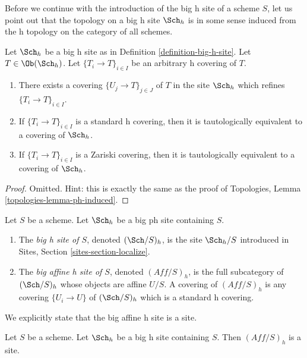 \medskip\noindent
Before we continue with the introduction of the big h site of
a scheme $S$, let us point out that the topology on a big h site
$\Sch_h$ is in some sense induced from the h topology
on the category of all schemes.

\begin{lemma}
\label{lemma-h-induced}
Let $\Sch_h$ be a big h site as in
Definition \ref{definition-big-h-site}.
Let $T \in \Ob(\Sch_h)$.
Let $\{T_i \to T\}_{i \in I}$ be an arbitrary h covering of $T$.
\begin{enumerate}
\item There exists a covering $\{U_j \to T\}_{j \in J}$ of $T$ in the site
$\Sch_h$ which refines $\{T_i \to T\}_{i \in I}$.
\item If $\{T_i \to T\}_{i \in I}$ is a standard h covering, then
it is tautologically equivalent to a covering of $\Sch_h$.
\item If $\{T_i \to T\}_{i \in I}$ is a Zariski covering, then
it is tautologically equivalent to a covering of $\Sch_h$.
\end{enumerate}
\end{lemma}

\begin{proof}
Omitted. Hint: this is exactly the same as the proof of
Topologies, Lemma \ref{topologies-lemma-ph-induced}.
\end{proof}

\begin{definition}
\label{definition-big-small-h}
Let $S$ be a scheme. Let $\Sch_h$ be a big ph site containing $S$.
\begin{enumerate}
\item The {\it big h site of $S$}, denoted
$(\Sch/S)_h$, is the site $\Sch_h/S$
introduced in Sites, Section \ref{sites-section-localize}.
\item The {\it big affine h site of $S$}, denoted
$(\textit{Aff}/S)_h$, is the full subcategory of
$(\Sch/S)_h$ whose objects are affine $U/S$.
A covering of $(\textit{Aff}/S)_h$ is any covering
$\{U_i \to U\}$ of $(\Sch/S)_h$ which is a standard h covering.
\end{enumerate}
\end{definition}

\noindent
We explicitly state that the big affine h site is a site.

\begin{lemma}
\label{lemma-verify-site-h}
Let $S$ be a scheme. Let $\Sch_h$ be a big h
site containing $S$. Then $(\textit{Aff}/S)_h$ is a site.
\end{lemma}

